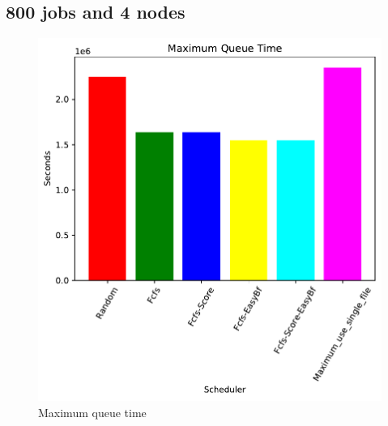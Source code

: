 \documentclass[a4paper]{article}
\begin{document}
	\subsection{800 jobs and 4 nodes}
	\begin{figure}[H]
	\begin{minipage}[b]{0.5\linewidth}\centering\includegraphics[width=1\linewidth]{MBSS/plot/2021-05-23-800_Maximum_queue_time4nodes.pdf}\caption{Maximum queue time}\vspace{4ex}\end{minipage}

\end{figure}
\end{document}
